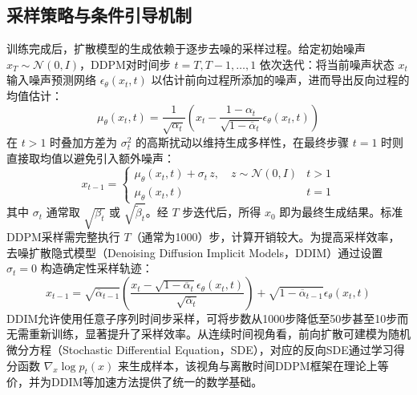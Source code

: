 \subsection{采样策略与条件引导机制}

训练完成后，扩散模型的生成依赖于逐步去噪的采样过程。给定初始噪声 $x_T\sim\mathcal{N}(0,I)$，DDPM对时间步 $t=T,T-1,\ldots,1$ 依次迭代：将当前噪声状态 $x_t$ 输入噪声预测网络 $\epsilon_\theta(x_t,t)$ 以估计前向过程所添加的噪声，进而导出反向过程的均值估计：
\begin{equation}\label{eq:ddpm_mean}
      \mu_\theta(x_t,t) = \frac{1}{\sqrt{\alpha_t}}\left(x_t - \frac{1-\alpha_t}{\sqrt{1-\overline{\alpha}_t}}\epsilon_\theta(x_t,t)\right)
\end{equation}
在 $t>1$ 时叠加方差为 $\sigma_t^2$ 的高斯扰动以维持生成多样性，在最终步骤 $t=1$ 时则直接取均值以避免引入额外噪声：
\begin{equation}\label{eq:ddpm_sampling}
      x_{t-1} = \begin{cases} \mu_\theta(x_t,t) + \sigma_t\,z,\quad z\sim\mathcal{N}(0,I) & t > 1 \\ \mu_\theta(x_t,t) & t = 1 \end{cases}
\end{equation}
其中 $\sigma_t$ 通常取 $\sqrt{\beta_t}$ 或 $\sqrt{\tilde{\beta}_t}$。经 $T$ 步迭代后，所得 $x_0$ 即为最终生成结果。标准DDPM采样需完整执行 $T$（通常为1000）步，计算开销较大。为提高采样效率，去噪扩散隐式模型（Denoising Diffusion Implicit Models，DDIM）通过设置 $\sigma_t=0$ 构造确定性采样轨迹：
\begin{equation}\label{eq:ddim_sampling}
      x_{t-1} = \sqrt{\overline{\alpha}_{t-1}}\left(\frac{x_t - \sqrt{1-\overline{\alpha}_t}\epsilon_\theta(x_t,t)}{\sqrt{\overline{\alpha}_t}}\right) + \sqrt{1-\overline{\alpha}_{t-1}}\epsilon_\theta(x_t,t)
\end{equation}
DDIM允许使用任意子序列时间步采样，可将步数从1000步降低至50步甚至10步而无需重新训练，显著提升了采样效率。从连续时间视角看，前向扩散可建模为随机微分方程（Stochastic Differential Equation，SDE），对应的反向SDE通过学习得分函数 $\nabla_x\log p_t(x)$ 来生成样本，该视角与离散时间DDPM框架在理论上等价，并为DDIM等加速方法提供了统一的数学基础。

